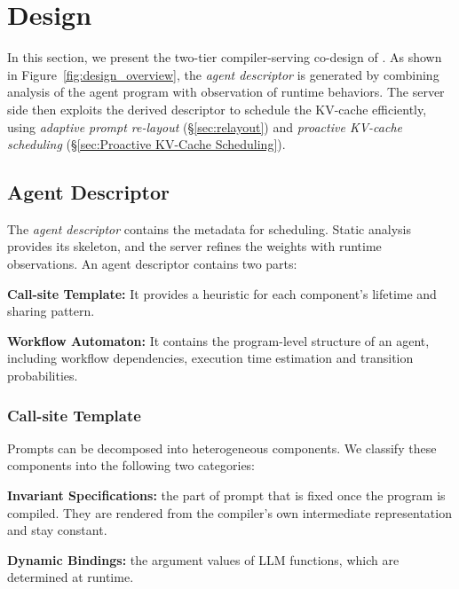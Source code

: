 
\section{Design}


\label{sec:design}
In this section, we present the two-tier compiler-serving co-design of \sysname. As shown in Figure~\ref{fig:design_overview}, the \emph{agent descriptor} is generated by combining analysis of the agent program with observation of runtime behaviors. The server side then exploits the derived descriptor to schedule the KV-cache efficiently, using \emph{adaptive prompt re-layout} (\S\ref{sec:relayout}) and \emph{proactive KV-cache scheduling} (\S\ref{sec:Proactive KV-Cache Scheduling}).


\subsection{Agent Descriptor}
The \emph{agent descriptor} contains the metadata for scheduling. Static analysis provides its skeleton, and the server refines the weights with runtime observations. An agent descriptor contains two parts: 
\begin{enumerate*}[label=(\roman*)]
    \item \textbf{Call-site Template:} It provides a heuristic for each component's lifetime and sharing pattern.
    \item \textbf{Workflow Automaton:} It contains the program-level structure of an agent, including workflow dependencies, execution time estimation and transition probabilities.
\end{enumerate*} 

\subsubsection{Call-site Template}
\label{sec:template}


Prompts can be decomposed into heterogeneous components. We classify these components into the following two categories:
\begin{enumerate*}[label=(\roman*)]
    \item \textbf{Invariant Specifications:} the part of prompt that is fixed once the program is compiled. They are rendered from the compiler's own intermediate representation and stay constant.
    \item \textbf{Dynamic Bindings:} the argument values of LLM functions, which are determined at runtime.
\end{enumerate*}

